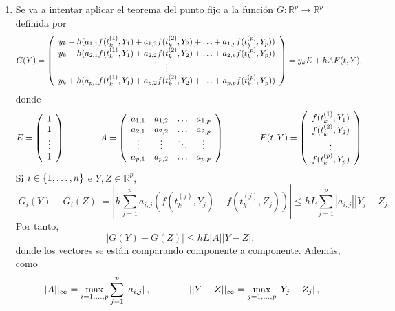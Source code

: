 \documentclass[11pt]{report}
\makeatletter
\renewenvironment{proof}[1][\proofname]{\par
  \pushQED{\qed}%
  \normalfont \topsep\z@skip %
  \trivlist
  \item[\hskip\labelsep
        \itshape
    #1\@addpunct{.}]\ignorespaces
}{%
  \popQED\endtrivlist\@endpefalse
}
\theoremstyle{mytheorem}
\theoremstyle{mydefinition}
\theoremstyle{myexample}
\let\oldproofname=\proofname
\renewcommand{\proofname}{\rm\bf{\oldproofname}}}
\newcommand{\R}{\mathbb R}
\newcommand{\bars}[1]{\left| #1 \right|}
\makeatother
\begin{document}
\vspace{\parskip}

\begin{proof}
\hfill
\begin{enumerate}
    \item Se va a intentar aplicar el teorema del punto fijo a la función $G \colon \R^p \to \R^p$ definida por
\[G(Y) = \left(\begin{array}{c}
y_k+h(a_{1,1}f(t_k^{(1)},Y_1)+a_{1,2}f(t_k^{(2)},Y_2)+\mathellipsis+a_{1,p}f(t_k^{(p)},Y_p)) \\
y_k+h(a_{2,1}f(t_k^{(1)},Y_1)+a_{2,2}f(t_k^{(2)},Y_2)+\mathellipsis+a_{2,p}f(t_k^{(p)},Y_p)) \\
\vdots \\
y_k+h(a_{p,1}f(t_k^{(1)},Y_1)+a_{p,2}f(t_k^{(2)},Y_2)+\mathellipsis+a_{p,p}f(t_k^{(p)},Y_p)) \\
\end{array}\right) = y_kE+ hAF(t,Y),\]
donde
\[E = \left(\begin{array}{c}
    1 \\
    1 \\
    \vdots \\
    1
\end{array}\right) \qquad \qquad A = \left(\begin{array}{cccc}
    a_{1,1} & a_{1,2} & \mathellipsis & a_{1,p} \\
    a_{2,1} & a_{2,2} & \mathellipsis & a_{2,p} \\
    \vdots & \vdots & \ddots & \vdots \\
    a_{p,1} & a_{p,2} & \mathellipsis & a_{p,p} \\
\end{array}\right) \qquad \qquad F(t,Y) = \left(\begin{array}{c}
     f(t_k^{(1)},Y_1) \\
     f(t_k^{(2)},Y_2) \\
     \vdots \\
     f(t_k^{(p)},Y_p) 
\end{array}\right) \]
Si $i \in \{1,\mathellipsis,n\}$ e $Y,Z \in \R^p$,
\[\bars{G_i(Y)-G_i(Z)} = \bars{h\sum_{j=1}^pa_{i,j}(f(t_k^{(j)},Y_j)-f(t_k^{(j)},Z_j))} \leq hL\sum_{j=1}^p\bars{a_{i,j}}\bars{Y_j-Z_j}\]
Por tanto,
\begin{equation}\bars{G(Y)-G(Z)} \leq hL\bars{A}\bars{Y-Z},\end{equation}
donde los vectores se están comparando componente a componente. Además, como
\[||A||_{\infty} = \max_{i=1,\mathellipsis,p}\sum_{j=1}^p \bars{a_{i,j}}, \qquad \qquad ||Y-Z||_{\infty} = \max_{j=1,\mathellipsis,p} \bars{Y_j-Z_j},\]

\end{enumerate}
\end{proof}
\end{document}
